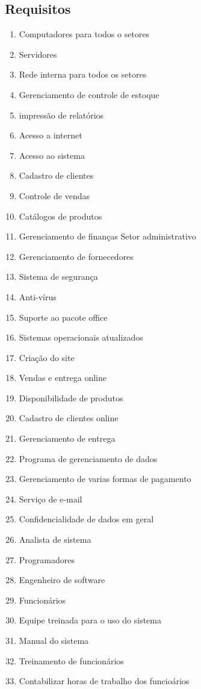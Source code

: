\subsection{Requisitos}
\begin{enumerate}
  \item Computadores para todos o setores
  \item Servidores
  \item Rede interna para todos os setores
  \item Gerenciamento de controle de estoque
  \item impressão de relatórios
  \item Acesso a internet
  \item Acesso ao sistema
  \item Cadastro de clientes
  \item Controle de vendas
  \item Catálogos de produtos
  \item Gerenciamento de finanças Setor administrativo
  \item Gerenciamento de fornecedores
  \item Sistema de segurança
  \item Anti-vírus
  \item Suporte ao pacote office
  \item Sistemas operacionais atualizados
  \item Criação do site
  \item Vendas e entrega online
  \item Disponibilidade de produtos
  \item Cadastro de clientes online
  \item Gerenciamento de entrega
  \item Programa de gerenciamento de dados
  \item Gerenciamento de varias formas de pagamento
  \item Serviço de e-mail
  \item Confidencialidade de dados em geral
  \item Analista de sistema
  \item Programadores
  \item Engenheiro de software
  \item Funcionários
  \item Equipe treinada para o uso do sistema
  \item Manual do sistema
  \item Treinamento de funcionários
  \item Contabilizar horas de trabalho dos funcioários

\end{enumerate}
